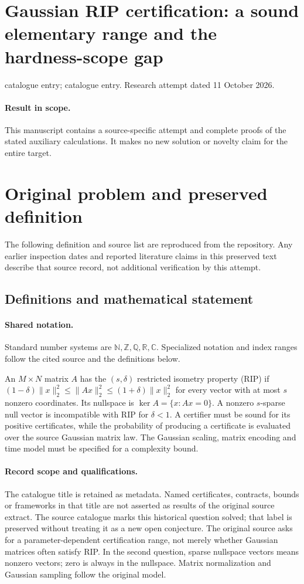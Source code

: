 \documentclass[11pt]{article}
\begin{document}
\section*{Gaussian RIP certification: a sound elementary range and the hardness-scope gap}
\noindent catalogue entry; catalogue entry. Research attempt dated 11 October 2026.
\paragraph{Result in scope.}This manuscript contains a source-specific attempt and complete proofs of the stated auxiliary calculations. It makes no new solution or novelty claim for the entire target.
\section{Original problem and preserved definition}
The following definition and source list are reproduced from the repository. Any earlier inspection dates and reported literature claims in this preserved text describe that source record, not additional verification by this attempt.
\subsection{Definitions and mathematical statement}

\paragraph{Shared notation.}Standard number systems are $\mathbb N,\mathbb Z,\mathbb Q,\mathbb R,\mathbb C$. Specialized notation and index ranges follow the cited source and the definitions below.


An $M\times N$ matrix $A$ has the $(s,\delta)$ restricted isometry property (RIP) if $(1-\delta)\lVert x\rVert_2^2\leq\lVert Ax\rVert_2^2\leq(1+\delta)\lVert x\rVert_2^2$ for every vector with at most $s$ nonzero coordinates. Its nullspace is $\ker A=\{x:Ax=0\}$. A nonzero $s$-sparse null vector is incompatible with RIP for $\delta<1$. A certifier must be sound for its positive certificates, while the probability of producing a certificate is evaluated over the source Gaussian matrix law. The Gaussian scaling, matrix encoding and time model must be specified for a complexity bound.
\paragraph{Record scope and qualifications.}
The catalogue title is retained as metadata. Named certificates, contracts, bounds or frameworks in that title are not asserted as results of the original source extract.
The source catalogue marks this historical question solved; that label is preserved without treating it as a new open conjecture. The original source asks for a parameter-dependent certification range, not merely whether Gaussian matrices often satisfy RIP. In the second question, sparse nullspace vectors means nonzero vectors; zero is always in the nullspace. Matrix normalization and Gaussian sampling follow the original model.
\end{document}
